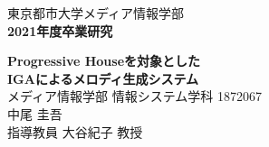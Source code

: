 \documentclass[fleqn,11pt]{jreport}
\begin{document}
\baselineskip 21.5pt

\begin{titlepage}
	\vspace*{3cm}
	\begin{center}
		{\Large\gt 東京都市大学メディア情報学部}\\
		\vspace*{0.5cm}
		{\Large\bf 2021年度卒業研究}\\
		\vspace{1.5cm}

		{\huge\bf Progressive Houseを対象とした}\\
		\vspace{0.5cm}
		{\huge\bf IGAによるメロディ生成システム}\\

		\vspace{9cm}
		{\Large メディア情報学部 情報システム学科 1872067}\\
		{\Large 中尾 圭吾}\\
		\vspace*{0.5cm}
		{\Large 指導教員 大谷紀子 教授}\\
	\end{center}
\end{titlepage}

\tableofcontents
\cleardoublepage











%


\appendix


\end{document}
